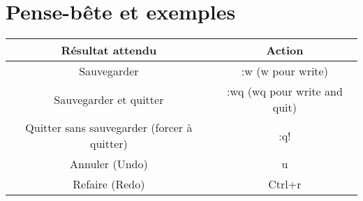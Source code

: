 \chapter{Pense-bête et exemples}
\bigskip
\begin{tabular}[H]{|c|c|}
  \hline
  Résultat attendu & Action\\
  \hline
  Sauvegarder & :w (w pour write)\\
  Sauvegarder et quitter & :wq (wq pour write and quit)\\
  Quitter sans sauvegarder (forcer à quitter) & :q! \\
  Annuler (Undo) & u \\
  Refaire (Redo) & Ctrl+r \\
  \hline
\end{tabular}
\bigskip

